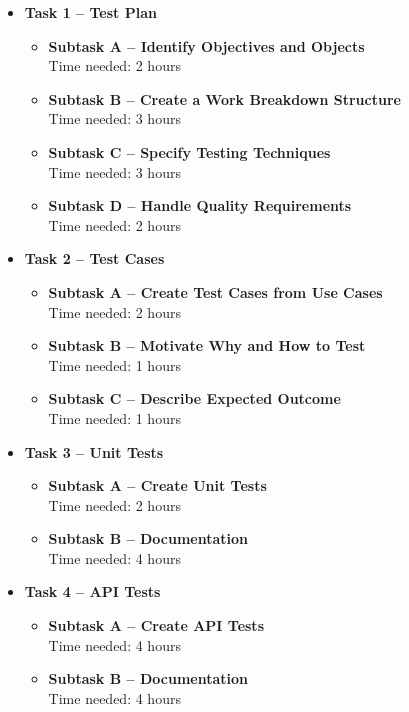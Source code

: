 \begin{itemize}
\item
  \textbf{Task 1 -- Test Plan}
  \begin{itemize}
  \item \textbf{Subtask A -- Identify Objectives and Objects}\\
        Time needed: 2 hours
  \item \textbf{Subtask B -- Create a Work Breakdown Structure}\\
        Time needed: 3 hours
  \item \textbf{Subtask C -- Specify Testing Techniques}\\
        Time needed: 3 hours
  \item \textbf{Subtask D -- Handle Quality Requirements}\\
        Time needed: 2 hours
  \end{itemize}

\item
  \textbf{Task 2 -- Test Cases}
  \begin{itemize}
  \item \textbf{Subtask A -- Create Test Cases from Use Cases}\\
        Time needed: 2 hours
  \item \textbf{Subtask B -- Motivate Why and How to Test}\\
        Time needed: 1 hours
  \item \textbf{Subtask C -- Describe Expected Outcome}\\
        Time needed: 1 hours
  \end{itemize}

\item
  \textbf{Task 3 -- Unit Tests}
  \begin{itemize}
  \item \textbf{Subtask A -- Create Unit Tests}\\
        Time needed: 2 hours
  \item \textbf{Subtask B -- Documentation}\\
        Time needed: 4 hours
  \end{itemize}

\item
  \textbf{Task 4 -- API Tests}
  \begin{itemize}
  \item \textbf{Subtask A -- Create API Tests}\\
        Time needed: 4 hours
  \item \textbf{Subtask B -- Documentation}\\
        Time needed: 4 hours
  \end{itemize}
\end{itemize}

